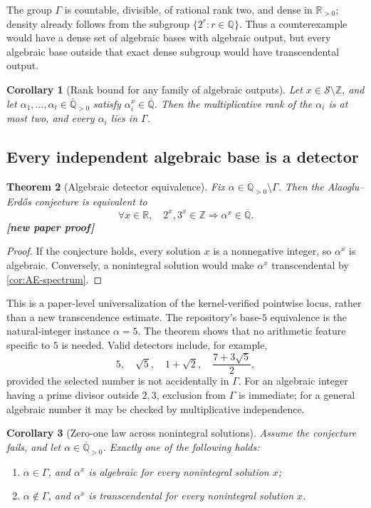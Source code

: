 \documentclass[11pt,oneside]{article}
\newtheorem{theorem}{Theorem}[section]
\newtheorem{corollary}[theorem]{Corollary}
\theoremstyle{definition}
\theoremstyle{remark}
\newcommand{\Z}{\mathbb Z}
\newcommand{\Q}{\mathbb Q}
\newcommand{\R}{\mathbb R}
\newcommand{\Qbar}{\overline{\mathbb Q}}
\newcommand{\Apos}{\overline{\mathbb Q}_{>0}}
\newcommand{\Sol}{\mathcal S}
\newcommand{\statusnew}{\textcolor{NewViolet}{\textbf{[new paper proof]}}}
\begin{document}
The group $\Gamma$ is countable, divisible, of rational rank two, and dense in
$\R_{>0}$; density already follows from the subgroup $\{2^r:r\in\Q\}$.  Thus a counterexample
would have a dense set of algebraic bases with algebraic output, but every algebraic base
outside that exact dense subgroup would have transcendental output.

\begin{corollary}[Rank bound for any family of algebraic outputs]
Let $x\in\Sol\setminus\Z$, and let $\alpha_1,\ldots,\alpha_t\in\Apos$ satisfy
$\alpha_i^x\in\Qbar$.  Then the multiplicative rank of the $\alpha_i$ is at most two, and
every $\alpha_i$ lies in $\Gamma$.
\end{corollary}

\subsection{Every independent algebraic base is a detector}

\begin{theorem}[Algebraic detector equivalence]\label{thm:detector}
Fix $\alpha\in\Apos\setminus\Gamma$.  Then the Alaoglu--Erd\H{o}s conjecture is equivalent to
\[
  \forall x\in\R,\quad
  2^x,3^x\in\Z
  \Longrightarrow
  \alpha^x\in\Qbar.
\]
\statusnew
\end{theorem}

\begin{proof}
If the conjecture holds, every solution $x$ is a nonnegative integer, so $\alpha^x$ is
algebraic.  Conversely, a nonintegral solution would make $\alpha^x$ transcendental by
\cref{cor:AE-spectrum}.
\end{proof}

This is a paper-level universalization of the kernel-verified pointwise locus, rather than a
new transcendence estimate.  The repository's base-$5$ equivalence is the natural-integer
instance $\alpha=5$.  The theorem
shows that no arithmetic feature specific to $5$ is needed.  Valid detectors include, for
example,
\[
  5,\quad \sqrt5,\quad 1+\sqrt2,\quad \frac{7+3\sqrt5}{2},
\]
provided the selected number is not accidentally in $\Gamma$.  For an algebraic integer
having a prime divisor outside $2,3$, exclusion from $\Gamma$ is immediate; for a general
algebraic number it may be checked by multiplicative independence.

\begin{corollary}[Zero-one law across nonintegral solutions]
Assume the conjecture fails, and let $\alpha\in\Apos$.  Exactly one of the following holds:
\begin{enumerate}
\item $\alpha\in\Gamma$, and $\alpha^x$ is algebraic for every nonintegral solution $x$;
\item $\alpha\notin\Gamma$, and $\alpha^x$ is transcendental for every nonintegral solution
      $x$.
\end{enumerate}
\end{corollary}
\end{document}
